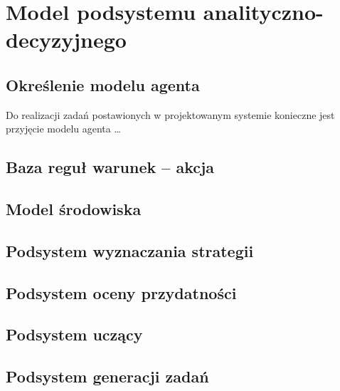 \section{Model podsystemu analityczno-decyzyjnego}
\subsection{Określenie modelu agenta}
Do realizacji zadań postawionych w projektowanym systemie konieczne jest przyjęcie modelu agenta …
\subsection{Baza reguł warunek – akcja}
\subsection{Model środowiska}
\subsection{Podsystem wyznaczania strategii}
\subsection{Podsystem oceny przydatności}
\subsection{Podsystem uczący}
\subsection{Podsystem generacji zadań}
